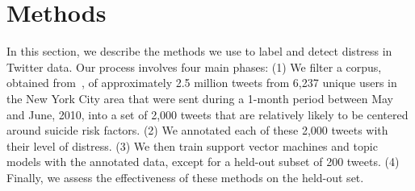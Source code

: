 \documentclass[11pt]{article}
\begin{document}
\section{Methods}
In this section, we describe the methods we use to label and detect distress in Twitter data. Our process involves four main phases: (1) We filter a corpus, obtained from~, of approximately 2.5 million tweets from 6,237 unique users in the New York City area that were sent during a 1-month period between May and June, 2010, into a set of 2,000 tweets that are relatively likely to be centered around suicide risk factors. (2) We annotated each of these 2,000 tweets with their level of distress. (3) We then train support vector machines and topic models with the annotated data, except for a held-out subset of 200 tweets. (4) Finally, we assess the effectiveness of these methods on the held-out set.
\end{document}
